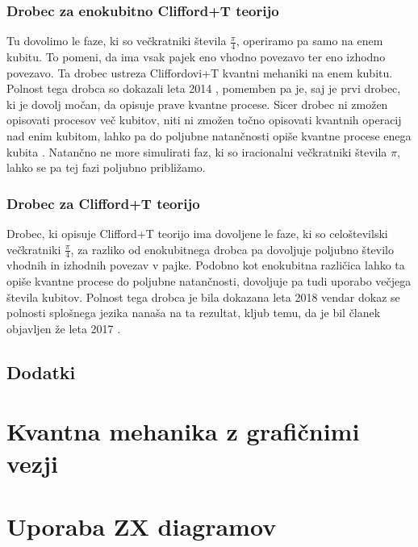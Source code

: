 \documentclass[mat1]{fmfdelo}
\begin{document}
\subsubsection{Drobec za enokubitno Clifford+T teorijo}
Tu dovolimo le faze, ki so večkratniki števila \(\frac\pi4\), operiramo pa samo na enem kubitu. To pomeni, da ima vsak pajek eno vhodno povezavo ter eno izhodno povezavo. Ta drobec ustreza Cliffordovi+T kvantni mehaniki na enem kubitu. Polnost tega drobca so dokazali leta 2014 \cite{backens2014zx}, pomemben pa je, saj je prvi drobec, ki je dovolj močan, da opisuje prave kvantne procese. Sicer drobec ni zmožen opisovati procesov več kubitov, niti ni zmožen točno opisovati kvantnih operacij nad enim kubitom, lahko pa do poljubne natančnosti opiše kvantne procese enega kubita \cite{814621}. Natančno ne more simulirati faz, ki so iracionalni večkratniki števila \(\pi\), lahko se pa tej fazi poljubno približamo.
\subsubsection{Drobec za Clifford+T teorijo}
Drobec, ki opisuje Clifford+T teorijo ima dovoljene le faze, ki so celoštevilski večkratniki \(\frac\pi4\), za razliko od enokubitnega drobca pa dovoljuje poljubno število vhodnih in izhodnih povezav v pajke. Podobno kot enokubitna različica lahko ta opiše kvantne procese do poljubne natančnosti, dovoljuje pa tudi uporabo večjega števila kubitov. Polnost tega drobca je bila dokazana leta 2018 \cite{SimonCompleteness} vendar dokaz se polnosti splošnega jezika nanaša na ta rezultat, kljub temu, da je bil članek objavljen že leta 2017 \cite{kangfengng}.
\subsection{Dodatki}
\section{Kvantna mehanika z grafičnimi vezji}
\section{Uporaba ZX diagramov}
\end{document}
